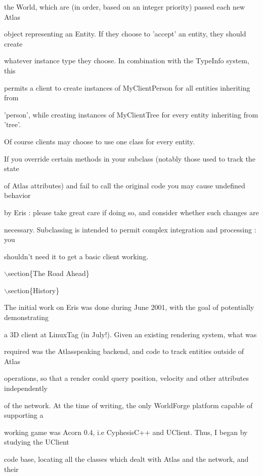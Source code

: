 \documentclass[12pt]{article}
\begin{document}
the World, which are (in order, based on an integer priority) passed each new Atlas

object representing an Entity. If they choose to 'accept' an entity, they should create

whatever instance type they choose. In combination with the TypeInfo system, this

permits a client to create instances of MyClientPerson for all entities inheriting from

'person', while creating instances of MyClientTree for every entity inheriting from 'tree'.

Of course clients may choose to use one class for every entity.



If you override certain methods in your subclass (notably those used to track the state

of Atlas attributes) and fail to call the original code you may cause undefined behavior

by Eris : please take great care if doing so, and consider whether such changes are

necessary. Subclassing is intended to permit complex integration and processing : you

shouldn't need it to get a basic client working. 



\ensuremath{\backslash}section\{The Road Ahead\}







\ensuremath{\backslash}section\{History\} 



The initial work on Eris was done during June 2001, with the goal of potentially demonstrating

a 3D client at LinuxTag (in July!). Given an existing rendering system, what was

required was the Atlasspeaking backend, and code to track entities outside of Atlas

operations, so that a render could query position, velocity and other attributes independently

of the network. At the time of writing, the only WorldForge platform capable of supporting a

working game was Acorn 0.4, i.e CyphesisC++ and UClient. Thus, I began by studying the UClient

code base, locating all the classes which dealt with Atlas and the network, and their
\end{document}
